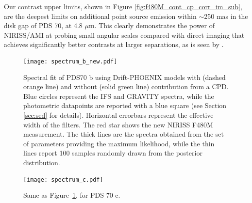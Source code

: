 \documentclass[11pt,twocolumn,twocolappendix]{aastex631}
\newcommand{\rdnote}[1]{{\color{red} [R.D.: #1]}}
\begin{document}
Our contrast upper limits, shown in Figure \ref{fig:f480M_cont_cp_corr_im_sub}, are the deepest limits on additional point source emission within $\sim$250 mas in the disk gap of PDS 70, at 4.8 $\mu$m. This clearly demonstrates the power of {NIRISS/AMI} %
at probing small angular scales compared with direct imaging that achieves significantly better contrasts at larger separations, as is seen by \cite{2024arXiv240304855C} {\citep[see also][]{2023ApJ...951L..20C}}. 




\begin{figure}
\centering
\texttt{[image: spectrum\_b\_new.pdf]}
\caption{Spectral fit of PDS70 b using Drift-PHOENIX models with (dashed orange line) and without (solid green line) contribution from a CPD. Blue circles represent the IFS and GRAVITY spectra, %
while the photometric datapoints are reported with a blue square {(see Section \ref{sec:sed} for details)}. Horizontal errorbars represent the effective width of the filters. The red star shows the new NIRISS F480M measurement. The thick lines are the spectra obtained from the set of parameters providing the maximum likelihood, while the thin lines report 100 samples randomly drawn from the posterior distribution.}
\label{fig:spectrum_b}
\end{figure}


\begin{figure}
\centering
\texttt{[image: spectrum\_c.pdf]}
\caption{Same as Figure~\ref{fig:spectrum_b}, for PDS 70 c.}
\label{fig:spectrum_c}
\end{figure}
\end{document}
